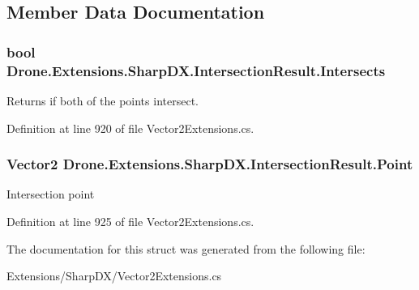\subsection{Member Data Documentation}
\hypertarget{struct_drone_1_1_extensions_1_1_sharp_d_x_1_1_intersection_result_a53750e288ee28b662e64de427be78274}{}
\subsubsection[{Intersects}]{\setlength{\rightskip}{0pt plus 5cm}bool Drone.\+Extensions.\+Sharp\+D\+X.\+Intersection\+Result.\+Intersects}\label{struct_drone_1_1_extensions_1_1_sharp_d_x_1_1_intersection_result_a53750e288ee28b662e64de427be78274}


Returns if both of the points intersect. 



Definition at line 920 of file Vector2\+Extensions.\+cs.

\hypertarget{struct_drone_1_1_extensions_1_1_sharp_d_x_1_1_intersection_result_a05f595d10cdea02a9a6b9604099e7340}{}
\subsubsection[{Point}]{\setlength{\rightskip}{0pt plus 5cm}Vector2 Drone.\+Extensions.\+Sharp\+D\+X.\+Intersection\+Result.\+Point}\label{struct_drone_1_1_extensions_1_1_sharp_d_x_1_1_intersection_result_a05f595d10cdea02a9a6b9604099e7340}


Intersection point 



Definition at line 925 of file Vector2\+Extensions.\+cs.



The documentation for this struct was generated from the following file\+:\begin{DoxyCompactItemize}
\item 
Extensions/\+Sharp\+D\+X/Vector2\+Extensions.\+cs\end{DoxyCompactItemize}
